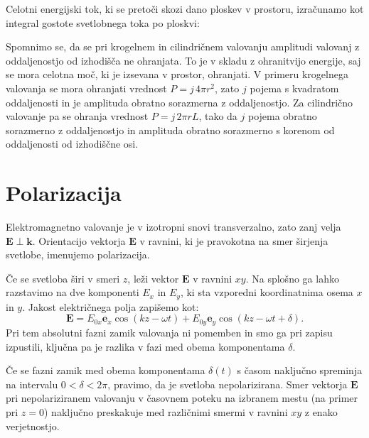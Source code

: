 Celotni energijski tok, ki se pretoči skozi dano ploskev v prostoru, izračunamo kot 
integral gostote svetlobnega toka po ploskvi:

\begin{remark}
Spomnimo se, da se pri krogelnem in cilindričnem valovanju
amplitudi valovanj
z oddaljenostjo od izhodišča ne ohranjata. To je v skladu z ohranitvijo energije, saj 
se mora celotna moč, ki je izsevana v prostor, ohranjati. V primeru krogelnega
valovanja se mora ohranjati vrednost $P = j\,4 \pi r^2$, zato $j$ pojema s kvadratom
oddaljenosti in je amplituda obratno sorazmerna z oddaljenostjo. Za cilindrično
valovanje pa se ohranja vrednost $P = j\,2\pi r L$, tako da $j$ pojema obratno
sorazmerno z oddaljenostjo in amplituda obratno sorazmerno s korenom od oddaljenosti
od izhodiščne osi. 
\end{remark}

\section{Polarizacija}
Elektromagnetno valovanje je v izotropni snovi 
transverzalno, zato zanj velja $\mathbf{E} \perp \mathbf{k}$. Orientacijo 
vektorja $\mathbf{E}$ v ravnini, ki je pravokotna na smer
širjenja svetlobe, imenujemo polarizacija.

Če se svetloba širi v smeri $z$, leži vektor $\mathbf{E}$ v ravnini $xy$. 
Na splošno ga lahko razstavimo na dve komponenti $E_x$ in $E_y$, ki sta
vzporedni koordinatnima osema $x$ in $y$. Jakost električnega
polja zapišemo kot:
\begin{equation}
\mathbf{E} = E_{0x} \mathbf{e}_x \cos \left(kz - \omega t\right) + 
E_{0y} \mathbf{e}_y \cos \left(kz - \omega t + \delta\right)\!.
\label{eq:03_37}
\end{equation}
Pri tem absolutni fazni zamik valovanja ni pomemben in smo ga 
pri zapisu izpustili, ključna pa je razlika v fazi med obema 
komponentama $\delta$.

Če se fazni zamik med obema komponentama $\delta(t)$ s časom 
naključno spreminja na intervalu $0<\delta <2\pi$, pravimo, da je 
svetloba nepolarizirana. Smer vektorja $\mathbf{E}$ pri nepolariziranem
valovanju v časovnem
poteku na izbranem mestu (na primer pri $z=0$) naključno preskakuje med
različnimi smermi v ravnini $xy$ z enako verjetnostjo.

